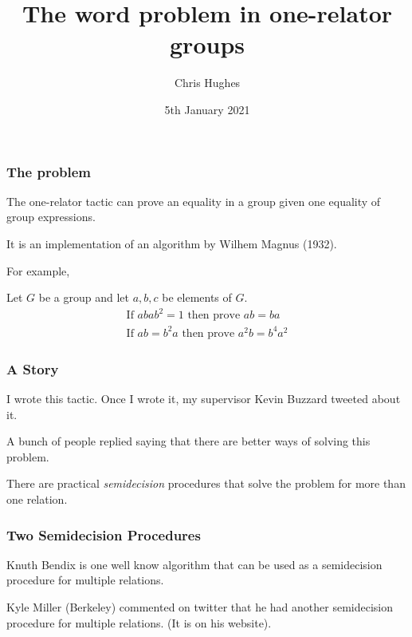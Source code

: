 \documentclass{beamer}
\title[Word problem in groups]{The word problem in one-relator groups} %
\author{Chris Hughes} %
\institute[Imperial College London] %
{
Imperial College London \\ %
\medskip
}
\date{5th January 2021} %
\begin{document}
\lstset{language=lean}

\begin{frame}
\titlepage %
\end{frame}

\begin{frame}
\frametitle{The problem} %

The one-relator tactic can prove an equality in a group given
one equality of group expressions. \newline

It is an implementation of an algorithm by Wilhem Magnus (1932). \newline

For example, \newline

Let $G$ be a group and let $a, b, c$ be elements of $G$.
\begin{equation*}
  \begin{aligned}
  \text{If } abab^2 = 1 \text{ then prove } ab=ba \\
  \text{If } ab = b^2 a \text{ then prove } a^2b = b^4 a^2
  \end{aligned}
\end{equation*}
\end{frame}

\begin{frame}
  \frametitle{A Story}
  I wrote this tactic. Once I wrote it, my supervisor Kevin Buzzard tweeted about it. \newline

  A bunch of people replied saying that there are better ways of solving this problem. \newline

  There are practical \textit{semidecision} procedures that solve the problem for more than one
  relation. \newline

\end{frame}


\begin{frame}
  \frametitle{Two Semidecision Procedures}
  Knuth Bendix is one well know algorithm that can be used as a semidecision procedure
  for multiple relations. \newline

  Kyle Miller (Berkeley) commented on twitter that he had another
  semidecision procedure for multiple relations. (It is on his website).
\end{frame}
\end{document}
